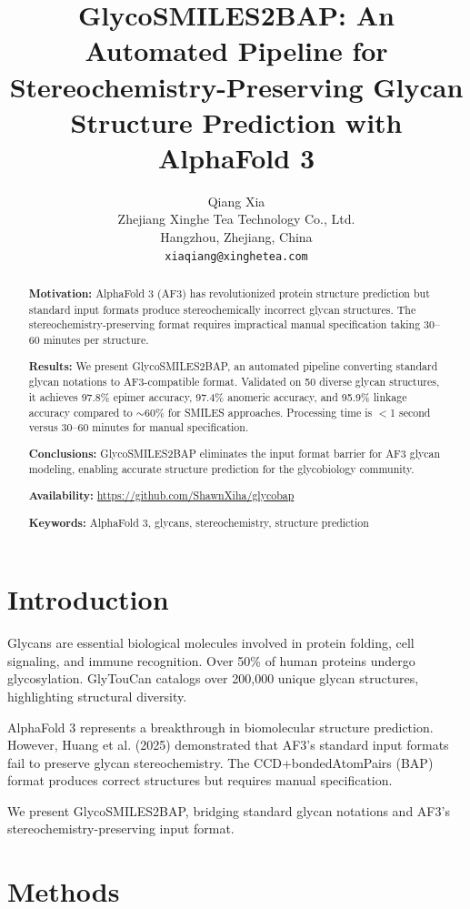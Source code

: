 \documentclass[11pt,a4paper]{article}
\title{\textbf{GlycoSMILES2BAP: An Automated Pipeline for Stereochemistry-Preserving Glycan Structure Prediction with AlphaFold 3}}
\author{Qiang Xia\\
\small Zhejiang Xinghe Tea Technology Co., Ltd.\\
\small Hangzhou, Zhejiang, China\\
\small \texttt{xiaqiang@xinghetea.com}}
\date{}
\begin{document}
\maketitle

\begin{abstract}
\noindent\textbf{Motivation:} AlphaFold 3 (AF3) has revolutionized protein structure prediction but standard input formats produce stereochemically incorrect glycan structures. The stereochemistry-preserving format requires impractical manual specification taking 30--60 minutes per structure.

\noindent\textbf{Results:} We present GlycoSMILES2BAP, an automated pipeline converting standard glycan notations to AF3-compatible format. Validated on 50 diverse glycan structures, it achieves 97.8\% epimer accuracy, 97.4\% anomeric accuracy, and 95.9\% linkage accuracy compared to ${\sim}60$\% for SMILES approaches. Processing time is $<$1 second versus 30--60 minutes for manual specification.

\noindent\textbf{Conclusions:} GlycoSMILES2BAP eliminates the input format barrier for AF3 glycan modeling, enabling accurate structure prediction for the glycobiology community.

\noindent\textbf{Availability:} \url{https://github.com/ShawnXiha/glycobap}

\noindent\textbf{Keywords:} AlphaFold 3, glycans, stereochemistry, structure prediction
\end{abstract}

\section{Introduction}

Glycans are essential biological molecules involved in protein folding, cell signaling, and immune recognition. Over 50\% of human proteins undergo glycosylation. GlyTouCan catalogs over 200,000 unique glycan structures, highlighting structural diversity.

AlphaFold 3 represents a breakthrough in biomolecular structure prediction. However, Huang et al. (2025) demonstrated that AF3's standard input formats fail to preserve glycan stereochemistry. The CCD+bondedAtomPairs (BAP) format produces correct structures but requires manual specification.

We present GlycoSMILES2BAP, bridging standard glycan notations and AF3's stereochemistry-preserving input format.

\section{Methods}
\end{document}
